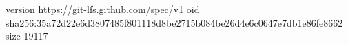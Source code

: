 version https://git-lfs.github.com/spec/v1
oid sha256:35a72d22e6d3807485f801118d8be2715b084be26d4e6c0647e7db1e86fe8662
size 19117
